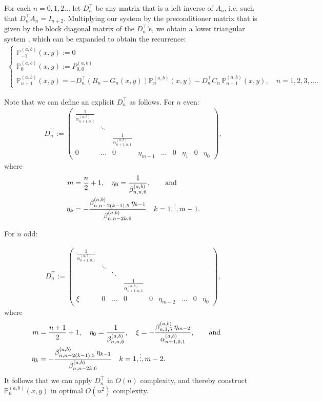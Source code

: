 \documentclass[11pt, oneside]{article}   	%
\newcommand{\bigP}{\mathbb{P}}
\newcommand{\alphaab}{\alpha^{(a,b)}}
\newcommand{\betaab}{\beta^{(a,b)}}
\newcommand{\bigPab}{\bigP^{(a,b)}}
\newcommand{\Dnt}{D^\top_n}
\begin{document}
For each $n = 0,1,2\dots$ let $\Dnt$ be any matrix that is a left inverse of $A_n$, i.e. such that $\Dnt A_n = I_{n+2}$. Multiplying our system by the preconditioner matrix that is given by the block diagonal matrix of the $\Dnt$'s, we obtain a lower triangular system \cite[p78]{dunkl2014orthogonal}, which can be expanded to obtain the recurrence:
\begin{align}
\begin{cases}
\bigPab_{-1}(x,y) := 0 \\
\bigPab_{0}(x,y) := P^{(a,b)}_{0,0} \\
\bigPab_{n+1}(x,y) = -\Dnt (B_n-G_n(x,y)) \bigPab_n(x,y) - \Dnt C_n  \,\bigPab_{n-1}(x,y), \quad n = 1,2,3,\dots.
\end{cases}
\end{align}

Note that we can define an explicit \(\Dnt\) as follows. For \(n\) even:
\begin{align}
\Dnt := \begin{pmatrix}
		\frac{1}{\alphaab_{n+1,0,1}} & & &  \\
		& \ddots & & & \\
		& & \frac{1}{\alphaab_{n+1,n,1}} & \\
		0 & \hdots & 0 & \eta_{m-1} & \hdots & 0 & \eta_1 & 0 & \eta_0
	    \end{pmatrix},
\end{align}
where
\begin{align}
m &= \frac{n}{2} + 1, \quad \eta_0 = \frac{1}{\betaab_{n,n,6}},\qqand \nonumber \\
\eta_k &= -\frac{\betaab_{n,n-2(k-1),5} \: \eta_{k-1}}{\betaab_{n,n-2k,6}} \quad k = 1,\dots,m-1.
\end{align}

For \(n\) odd:

\begin{align}
\Dnt := \begin{pmatrix}
		\frac{1}{\alphaab_{n+1,0,1}} & &  \\
		& \ddots & & &  \\
		& & \ddots & & \\
		& & & \frac{1}{\alphaab_{n+1,n,1}} & \\
		\xi & 0 & \hdots & 0 & 0 & \eta_{m-2} & \hdots & 0 & \eta_0
	    \end{pmatrix},
\end{align}
 where
\begin{align}
m &= \frac{n+1}{2} + 1,\quad  \eta_0 = \frac{1}{\betaab_{n,n,6}}, \quad \xi = -\frac{\betaab_{n,1,5} \: \eta_{m-2}}{\alphaab_{n+1,0,1}},\qqand \nonumber \\
\eta_k &= -\frac{\betaab_{n,n-2(k-1),5} \: \eta_{k-1}}{\betaab_{n,n-2k,6}} \quad k = 1,\dots,m-2.
\end{align}
It follows that we can apply $\Dnt$ in $O(n)$ complexity, and thereby construct $\bigPab_{n}(x,y)$ in optimal $O(n^2)$ complexity.
\end{document}
